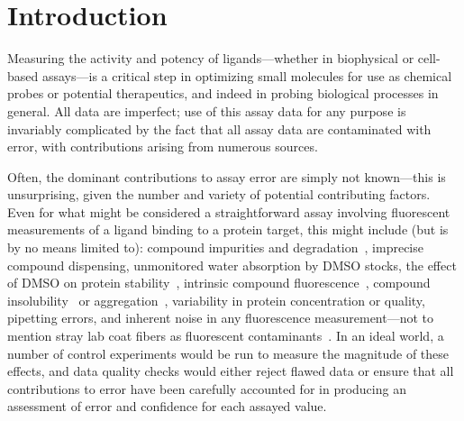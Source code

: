 \documentclass[aps,pre,twocolumn,nofootinbib,superscriptaddress,linenumbers]{revtex4-1}
\begin{document}
\section{Introduction}
\label{section:introduction}

Measuring the activity and potency of ligands---whether in biophysical or cell-based assays---is a critical step in optimizing small molecules for use as chemical probes or potential therapeutics, and indeed in probing biological processes in general.
All data are imperfect; use of this assay data for any purpose is invariably complicated by the fact that all assay data are contaminated with error, with contributions arising from numerous sources.

Often, the dominant contributions to assay error are simply not known---this is unsurprising, given the number and variety of potential contributing factors.
Even for what might be considered a straightforward assay involving fluorescent measurements of a ligand binding to a protein target, this might include (but is by no means limited to): compound impurities and degradation~\cite{kozikowski_effect_2003,kozikowski_effect_2003-1,cheng_studies_2003,waybright_overcoming_2009}, imprecise compound dispensing, unmonitored water absorption by DMSO stocks, the effect of DMSO on protein stability~\cite{tjernberg_dmso-related_2005}, intrinsic compound fluorescence~\cite{simeonov_fluorescence_2008,baell_new_2010}, compound insolubility~\cite{di_biological_2006} or aggregation~\cite{mcgovern_common_2002,mcgovern_kinase_2003,feng_high-throughput_2005,feng_synergy_2006,baell_new_2010}, variability in protein concentration or quality, pipetting errors, and inherent noise in any fluorescence measurement---not to mention stray lab coat fibers as fluorescent contaminants~\cite{busch_does_2015}. 
In an ideal world, a number of control experiments would be run to measure the magnitude of these effects, and data quality checks would either reject flawed data or ensure that all contributions to error have been carefully accounted for in producing an assessment of error and confidence for each assayed value.

\end{document}
